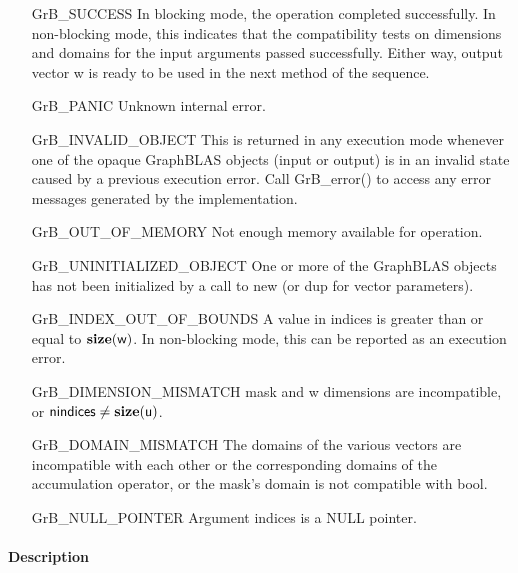 \begin{itemize}[leftmargin=2.1in]
    \item[{\sf GrB\_SUCCESS}]         In blocking mode, the operation completed
    successfully. In non-blocking mode, this indicates that the compatibility 
    tests on dimensions and domains for the input arguments passed successfully. 
    Either way, output vector {\sf w} is ready to be used in the next method of 
    the sequence.

    \item[{\sf GrB\_PANIC}]            Unknown internal error.
    
    \item[{\sf GrB\_INVALID\_OBJECT}] This is returned in any execution mode 
    whenever one of the opaque GraphBLAS objects (input or output) is in an invalid 
    state caused by a previous execution error.  Call {\sf GrB\_error()} to access 
    any error messages generated by the implementation.

    \item[{\sf GrB\_OUT\_OF\_MEMORY}]  Not enough memory available for operation.
    
    \item[{\sf GrB\_UNINITIALIZED\_OBJECT}] One or more of the GraphBLAS objects
    has not been initialized by a call to {\sf new} (or {\sf dup} for vector
    parameters).

    \item[{\sf GrB\_INDEX\_OUT\_OF\_BOUNDS}]  A value in {\sf indices} is greater
    than or equal to $\bold{size}({\sf w})$.  In non-blocking mode, this can be
    reported as an execution error.
    
    \item[{\sf GrB\_DIMENSION\_MISMATCH}] {\sf mask} and {\sf w} dimensions are
    incompatible, or ${\sf nindices} \neq \bold{size}({\sf u})$. 
    
    \item[{\sf GrB\_DOMAIN\_MISMATCH}]    The domains of the various vectors are
	incompatible with each other or the corresponding domains of the
    accumulation operator, or the mask's domain is not compatible with {\sf bool}.

    \item[{\sf GrB\_NULL\_POINTER}] Argument {\sf indices} is a {\sf NULL} pointer.
\end{itemize}

\paragraph{Description}

